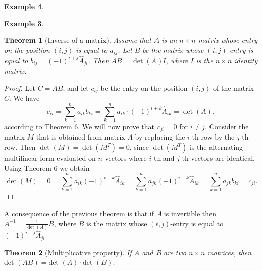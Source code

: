 \documentclass[11pt]{article}
\newtheorem{thm}{Theorem}[section]
\theoremstyle{definition}
\newtheorem{exmp}[thm]{Example}
\theoremstyle{plain}
\begin{document}
\begin{exmp}
\begin{exmp}
\begin{thm}[Inverse of a matrix]
Assume that \( A \) is an \( n\times n \) matrix whose entry on the position \( (i,j) \) is equal to \( a_{ij} \). Let \( B \) be the matrix whose \( (i,j) \) entry is equal to \( b_{ij}=(-1)^{i+j}\hat A_{ji} \). Then \( AB=\det (A)I \), where \( I \) is the \( n\times n \) identity matrix.
\end{thm}

\begin{proof}
Let \( C=AB \), and let \( c_{ij} \) be the entry on the position \( (i,j) \) of the matrix \( C \). We have \[ c_{ii}=\sum_{k=1}^n a_{ik}b_{ki}=\sum_{k=1}^n a_{ik}\cdot (-1)^{i+k}\hat A_{ik}=\det (A),\] according to Theorem 6. We will now prove that \( c_{ji}=0 \) for \( i\neq j \). Consider the matrix \( M \) that is obtained from matrix \( A \) by replacing the \( i \)-th row by the \( j \)-th row. Then \( \det(M)=\det(M^T)=0 \), since \( \det(M^T) \) is the alternating multilinear form evaluated on \( n \) vectors where \( i \)-th and \( j \)-th vectors are identical. Using Theorem 6 we obtain \[ \det (M)=0=\sum_{k=1}^n a_{ik}(-1)^{i+k}\hat A_{ik}=\sum_{k=1}^n a_{jk}(-1)^{i+k}\hat A_{ik}=\sum_{k=1}^n a_{jk}b_{ki}=c_{ji}.\]
\end{proof}

A consequence of the previous theorem is that if \( A \) is invertible then \( A^{-1}=\frac1{\det(A)} B \), where \( B \) is the matrix whose \( (i,j) \)-entry is equal to \( (-1)^{i+j}\hat A_{ji} \).

\begin{thm}[Multiplicative property]
If \( A \) and \( B \) are two \( n\times n \) matrices, then \( \mbox{det }(AB)=\mbox{det }(A)\cdot \mbox{det }(B) \).
\end{thm}


\end{exmp}
\end{exmp}
\end{document}

